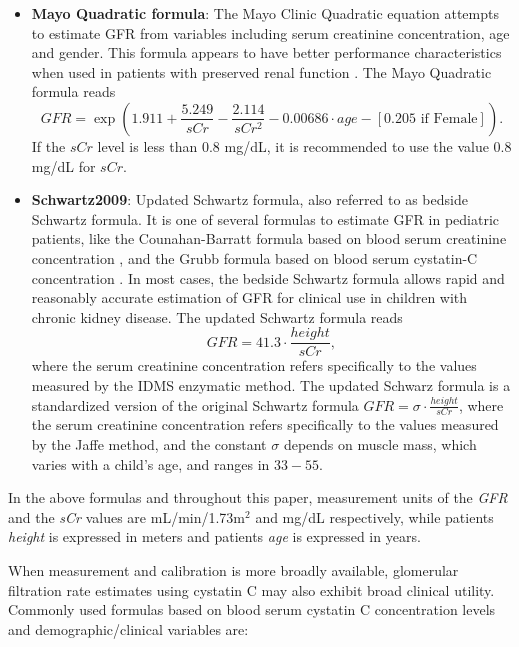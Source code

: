 \documentclass[10pt,final]{siamltex}
\begin{document}
\begin{itemize}
  \item \textbf{Mayo Quadratic formula}: The Mayo Clinic Quadratic equation attempts to estimate GFR from variables including serum creatinine concentration, age and gender. This formula appears to have better performance characteristics when used in patients with preserved renal function \cite{rigalleau,mayo}. The Mayo Quadratic formula reads
  \begin{equation}
    \textit{GFR} = \exp\left(1.911+\frac{5.249}{sCr}-\frac{2.114}{sCr^2}-0.00686\cdot age - [0.205 \text{ if Female}]\right).
  \end{equation}
  If the $sCr$ level is less than $0.8$ mg/dL, it is recommended to use the value $0.8$ mg/dL for $sCr$.

  \item \textbf{Schwartz2009}: Updated Schwartz formula, also referred to as bedside Schwartz formula. It is one of several formulas to estimate GFR in pediatric patients, like the Counahan-Barratt formula based on blood serum creatinine concentration \cite{Counahan}, and the Grubb formula based on blood serum cystatin-C concentration \cite{simonsen}. In most cases, the bedside Schwartz formula allows rapid and reasonably accurate estimation of GFR for clinical use in children with chronic kidney disease. The updated Schwartz formula reads
  \begin{equation}
    \mathit{GFR} = 41.3 \cdot \frac{height}{sCr},
  \end{equation}
  where the serum creatinine concentration refers specifically to the values measured by the IDMS enzymatic method. The updated Schwarz formula is a standardized version of the original Schwartz formula $\mathit{GFR} = \sigma \cdot \tfrac{height}{sCr}$, where the serum creatinine concentration refers specifically to the values measured by the Jaffe method, and the constant $\sigma$ depends on muscle mass, which varies with a child's age, and ranges in $33-55$.
\end{itemize}

In the above formulas and throughout this paper, measurement units of the \emph{GFR} and the \emph{sCr} values are mL/min/1.73m$^2$ and mg/dL respectively, while patients \emph{height} is expressed in meters and patients \emph{age} is expressed in years.

When measurement and calibration is more broadly available, glomerular filtration rate estimates using cystatin C may also exhibit broad clinical utility. Commonly used formulas based on blood serum cystatin C concentration levels and demographic/clinical variables are:
\end{document}
